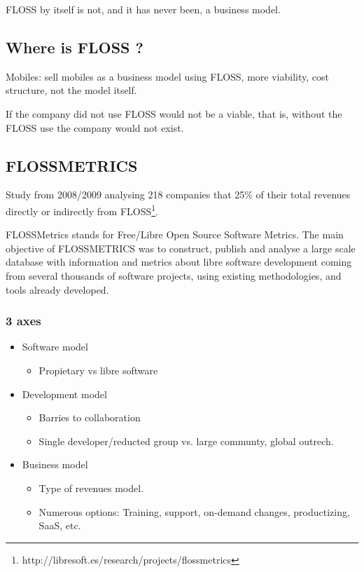 FLOSS by itself is not, and it has never been, a business model.

\subsection{Where is FLOSS ?}\label{sec:floss-bm}

Mobiles: sell mobiles as a business model using FLOSS, more viability, cost
 structure, not the model itself.

If the company did not use FLOSS would not be a viable, that is,  without the
  FLOSS use the company would not exist.


\subsection{FLOSSMETRICS}

Study from 2008/2009 analysing 218 companies that 25\% of their total revenues
 directly or indirectly from FLOSS\footnote{http://libresoft.es/research/projects/flossmetrics}.

FLOSSMetrics stands for Free/Libre Open Source Software Metrics. 
The main objective of FLOSSMETRICS was to construct, publish and analyse a large
 scale database with information and metrics about libre software development 
 coming from several thousands of software projects, using existing 
 methodologies, and tools already developed.

\subsubsection{3 axes}

\begin{itemize}
    \item Software model
    \begin{itemize}
        \item Propietary vs libre software
    \end{itemize}
    
    \item Development model
    \begin{itemize}
        \item Barries to collaboration
        \item Single developer/reducted group vs. large communty, global outrech.
    \end{itemize}
    
    \item Business model
    \begin{itemize}
        \item Type of revenues model.
        \item Numerous options: Training, support, on-demand changes, productizing, SaaS, etc.
    \end{itemize}
\end{itemize}


